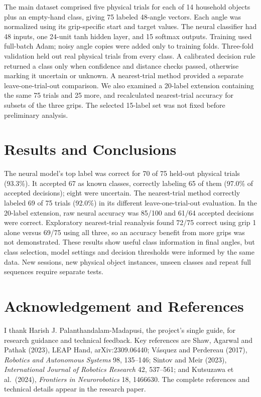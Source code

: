 \documentclass[11pt,a4paper]{article}
\begin{document}
The main dataset comprised five physical trials for each of 14 household objects plus an empty-hand class, giving 75 labeled 48-angle vectors. Each angle was normalized using its grip-specific start and target values. The neural classifier had 48 inputs, one 24-unit tanh hidden layer, and 15 softmax outputs. Training used full-batch Adam; noisy angle copies were added only to training folds. Three-fold validation held out real physical trials from every class. A calibrated decision rule returned a class only when confidence and distance checks passed, otherwise marking it uncertain or unknown. A nearest-trial method provided a separate leave-one-trial-out comparison. We also examined a 20-label extension containing the same 75 trials and 25 more, and recalculated nearest-trial accuracy for subsets of the three grips. The selected 15-label set was not fixed before preliminary analysis.

\section*{Results and Conclusions}

The neural model's top label was correct for 70 of 75 held-out physical trials (93.3\%). It accepted 67 as known classes, correctly labeling 65 of them (97.0\% of accepted decisions); eight were uncertain. The nearest-trial method correctly labeled 69 of 75 trials (92.0\%) in its different leave-one-trial-out evaluation. In the 20-label extension, raw neural accuracy was 85/100 and 61/64 accepted decisions were correct. Exploratory nearest-trial reanalysis found 72/75 correct using grip 1 alone versus 69/75 using all three, so an accuracy benefit from more grips was not demonstrated. These results show useful class information in final angles, but class selection, model settings and decision thresholds were informed by the same data. New sessions, new physical object instances, unseen classes and repeat full sequences require separate tests.

\section*{Acknowledgement and References}

I thank Harish J. Palanthandalam-Madapusi, the project's single guide, for research guidance and technical feedback. Key references are Shaw, Agarwal and Pathak (2023), LEAP Hand, arXiv:2309.06440; V\'asquez and Perdereau (2017), \emph{Robotics and Autonomous Systems} 98, 135--146; Sintov and Meir (2023), \emph{International Journal of Robotics Research} 42, 537--561; and Kutsuzawa et al.\ (2024), \emph{Frontiers in Neurorobotics} 18, 1466630. The complete references and technical details appear in the research paper.
\end{document}
